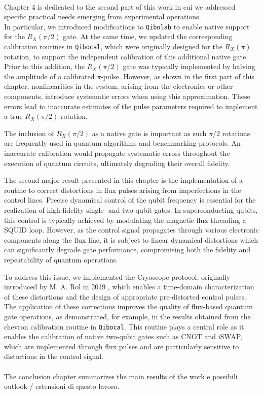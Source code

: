 \paragraph{}
Chapter 4 is dedicated to the second part of this work in cui we addressed specific practical needs emerging from experimental operations.\\
In particular, we introduced modifications to \texttt{Qibolab} to enable native support for the $R_X(\pi/2)$ gate. 
At the same time, we updated the corresponding calibration routines in \texttt{Qibocal}, which were originally designed for the $R_X(\pi)$ rotation, to support the independent calibration of this additional native gate.
Prior to this addition, the $R_X(\pi/2)$ gate was typically implemented by halving the amplitude of a calibrated $\pi$-pulse. 
However, as shown in the first part of this chapter, nonlinearities in the system, arising from the electronics or other components, introduce systematic errors when using this approximation. 
These errors lead to inaccurate estimates of the pulse parameters required to implement a true $R_X(\pi/2)$ rotation.

The inclusion of $R_X(\pi/2)$ as a native gate is important as such $\pi/2$ rotations are frequently used in quantum algorithms and benchmarking protocols. 
An inaccurate calibration would propagate systematic errors throughout the execution of quantum circuits, ultimately degrading their overall fidelity.

The second major result presented in this chapter is the implementation of a routine to correct distortions in flux pulses arising from imperfections in the control lines. 
Precise dynamical control of the qubit frequency is essential for the realization of high-fidelity single- and two-qubit gates. 
In superconducting qubits, this control is typically achieved by modulating the magnetic flux threading a SQUID loop. 
However, as the control signal propagates through various electronic components along the flux line, it is subject to linear dynamical distortions which can significantly degrade gate performance, compromising both the fidelity and repeatability of quantum operations.

To address this issue, we implemented the Cryoscope protocol, originally introduced by M. A. Rol in 2019 \cite{rol_time-domain_2020}, which enables a time-domain characterization of these distortions and the design of appropriate pre-distorted control pulses. 
The application of these corrections improves the quality of flux-based quantum gate operations, as demonstrated, for example, in the results obtained from the chevron calibration routine in \texttt{Qibocal}. 
This routine plays a central role as it enables the calibration of native two-qubit gates such as CNOT and iSWAP, which are implemented through flux pulses and are particularly sensitive to distortions in the control signal.

\paragraph{}
The conclusion chapter summarizes the main results of the work e possibili outlook / estensioni di questo lavoro.
